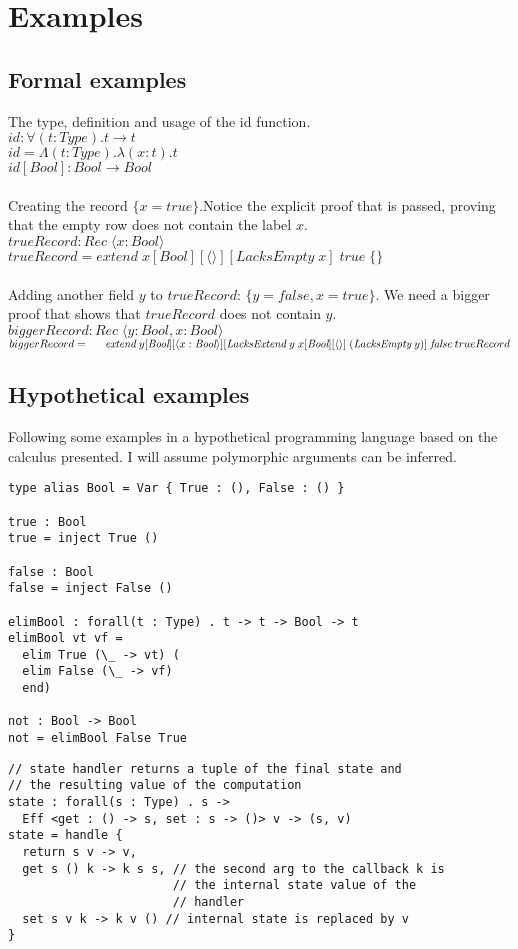 \documentclass[12pt]{article}
\newcommand\tapp[2]{#1 \; #2} %
\newcommand\tkapp[2]{#1 [ #2 ]} %
\newcommand\tarr[2]{#1 \rightarrow #2} %
\newcommand\tforall[3]{\forall(#1 : #2) . #3} %
\newcommand\tempty[0]{\langle\rangle} %
\newcommand\textendss[1]{\langle#1\rangle} %
\newcommand\ttype[0]{\textit{Type}} %
\newcommand\tbool[0]{\textit{Bool}} %
\newcommand\trecord[0]{\textit{Rec}} %
\newcommand\pempty[1]{\textit{LacksEmpty} \; #1} %
\newcommand\pextend[2]{\textit{LacksExtend} \; #1 \; #2} %
\newcommand\eapp[2]{#1 \; #2} %
\newcommand\eabs[3]{\lambda(#1 : #2) . #3} %
\newcommand\etabs[3]{\Lambda(#1 : #2) . #3} %
\newcommand\etapp[2]{#1 [ #2 ]} %
\newcommand\eempty[0]{\{\}} %
\newcommand\eextend[1]{\textit{extend} \; #1} %
\newcommand\etrue[0]{\textit{true}} %
\newcommand\efalse[0]{\textit{false}} %
\begin{document}
\section{Examples}
\subsection{Formal examples}
The type, definition and usage of the id function. \\
$id : \tforall{t}{\ttype}{\tarr{t}{t}}$ \\
$id = \etabs{t}{\ttype}{\eabs{x}{t}{t}}$ \\
$\etapp{id}{\tbool} : \tarr{\tbool}{\tbool}$ \\
\\
Creating the record $\{ x = true \}$.Notice the explicit proof that is passed, proving that the empty row does not contain the label $x$.\\
$trueRecord : \tapp{\trecord}{\textendss{x : \tbool}}$\\
$trueRecord = \eapp{\eapp{\etapp{\etapp{\etapp{\eextend{x}}{\tbool}}{\tempty}}{\pempty{x}}}{\etrue}}{\eempty}$\\
\\
Adding another field $y$ to $trueRecord$: $\{ y = false, x = true \}$. We need a bigger proof that shows that $trueRecord$ does not contain $y$.\\
$biggerRecord : \tapp{\trecord}{\textendss{y : \tbool, x : \tbool}}$ \\
$biggerRecord =\\\indent\eapp{\eapp{\etapp{\etapp{\etapp{\eextend{y}}{\tbool}}{\textendss{x : \tbool}}}{
\tapp{\tkapp{\tkapp{\pextend{y}{x}}{\tbool}}{\tempty}}{(\pempty{y})}
}}{\efalse}}{trueRecord}$

\newpage
\subsection{Hypothetical examples}
Following some examples in a hypothetical programming language based on the calculus presented. I will assume polymorphic arguments can be inferred.
\begin{lstlisting}[caption=Booleans as Variants]
type alias Bool = Var { True : (), False : () }

true : Bool
true = inject True ()

false : Bool
false = inject False ()

elimBool : forall(t : Type) . t -> t -> Bool -> t
elimBool vt vf =
  elim True (\_ -> vt) (
  elim False (\_ -> vf)
  end)

not : Bool -> Bool
not = elimBool False True
\end{lstlisting}
\begin{lstlisting}[caption=State effect]
// state handler returns a tuple of the final state and
// the resulting value of the computation
state : forall(s : Type) . s ->
  Eff <get : () -> s, set : s -> ()> v -> (s, v)
state = handle {
  return s v -> v,
  get s () k -> k s s, // the second arg to the callback k is
                       // the internal state value of the
                       // handler
  set s v k -> k v () // internal state is replaced by v
}
\end{lstlisting}
\newpage
\end{document}
